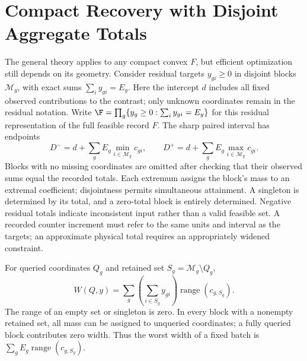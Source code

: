 \section{Compact Recovery with Disjoint Aggregate Totals}
\label{sec:structured}
The general theory applies to any compact convex $F$, but efficient
optimization still depends on its geometry. Consider residual targets
$y_{gi}\geq0$ in disjoint blocks $\mathcal M_g$, with exact sums
$\sum_i y_{gi}=E_g$. Here the intercept $d$ includes all fixed observed
contributions to the contrast; only unknown coordinates remain in the
residual notation. Write
$\F=\prod_g\{y_g\geq0:\sum_i y_{gi}=E_g\}$ for this residual
representation of the full feasible record $F$. The sharp paired interval has endpoints
\begin{equation}
 D^-=d+\sum_g E_g\min_{i\in\mathcal M_g}c_{gi},\qquad
 D^+=d+\sum_g E_g\max_{i\in\mathcal M_g}c_{gi}.
 \label{eq:sharp}
\end{equation}
Blocks with no missing coordinates are omitted after checking that their
observed sums equal the recorded totals.
Each extremum assigns the block's mass to an extremal coefficient;
disjointness permits simultaneous attainment. A singleton is determined
by its total, and a zero-total block is entirely determined. Negative
residual totals indicate inconsistent input rather than a valid feasible
set. A recorded counter increment must refer to the same units and
interval as the targets; an approximate physical total requires an
appropriately widened constraint.

For queried coordinates $Q_g$ and retained set $S_g=\mathcal M_g\setminus Q_g$,
\begin{equation}
 W(Q,y)=\sum_g\left(\sum_{i\in S_g}y_{gi}\right)
                  \operatorname{range}(c_{g,S_g}).
 \label{eq:querywidth}
\end{equation}
The range of an empty set or singleton is zero. In every block with a
nonempty retained set, all mass can be assigned to unqueried coordinates;
a fully queried block contributes zero width. Thus the worst width of a fixed batch is
$\sum_g E_g\operatorname{range}(c_{g,S_g})$.

